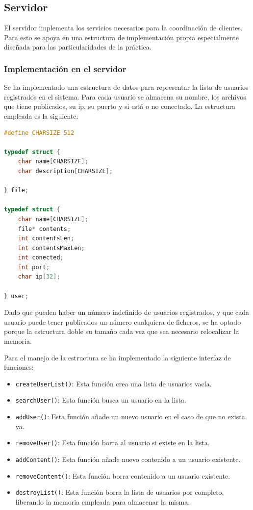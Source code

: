 \documentclass[]{article}
\begin{document}
\subsection{Servidor}
\label{subsec:servidor}
El servidor implementa los servicios necesarios para la coordinación de clientes. Para esto se apoya en una estructura de implementación propia especialmente diseñada para las particularidades de la práctica. 

\subsubsection{Implementación en el servidor}
\label{subsec:implementacion_servidor}
Se ha implementado una estructura de datos para representar la lista de usuarios registrados en el sistema. Para cada usuario se almacena su nombre, los archivos que tiene publicados, su ip, su puerto y si está o no conectado. La estructura empleada es la siguiente: 

\begin{lstlisting}[language=C]
#define CHARSIZE 512

typedef struct {
    char name[CHARSIZE];
    char description[CHARSIZE];

} file;

typedef struct {
    char name[CHARSIZE];
    file* contents;
    int contentsLen;
    int contentsMaxLen;
    int conected;
    int port;
    char ip[32];

} user;

\end{lstlisting}

Dado que pueden haber un número indefinido de usuarios registrados, y que cada usuario puede tener publicados un número cualquiera de ficheros, se ha optado porque la estructura doble su tamaño cada vez que sea necesario relocalizar la memoria.

Para el manejo de la estructura se ha implementado la siguiente interfaz de funciones: 

\begin{itemize}
  \item \texttt{createUserList()}: Esta función crea una lista de usuarios vacía.
  \item \texttt{searchUser()}: Esta función busca un usuario en la lista.
  \item \texttt{addUser()}: Esta función añade un nuevo usuario en el caso de que no exista ya.
  \item \texttt{removeUser()}: Esta función borra al usuario si existe en la lista.
  \item \texttt{addContent()}: Esta función añade nuevo contenido a un usuario existente.
  \item \texttt{removeContent()}: Esta función borra contenido a un usuario existente.
  \item \texttt{destroyList()}: Esta función borra la lista de usuarios por completo, liberando la memoria empleada para almacenar la misma.
\end{itemize}
\end{document}

